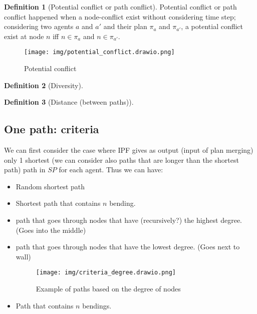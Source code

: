 \documentclass{article}
\theoremstyle{definition}
\newtheorem{definition}{Definition}[section]
\newcommand\widthimg{11cm}
\begin{document}
\begin{definition}[Potential conflict or path conflict]\label{def_potential_conflict}
   Potential conflict or path conflict happened when  a node-conflict exist without considering time step; considering two agents $a$ and $a'$ and their plan $\pi_a$ and $\pi_{a'}$, a potential conflict exist at node $n$ iff $n\in\pi_a$ and $n\in\pi_{a'}$. 
  
\end{definition}

\begin{figure}[H]\label{img:potential_conflict}
  \centering
  \caption{Potential conflict}
  \texttt{[image: img/potential\_conflict.drawio.png]}
\end{figure}

\begin{definition}[Diversity]

\end{definition}

\begin{definition}[Distance (between paths)]
  
\end{definition}

\subsection{One path: criteria}

We can first consider the case where IPF gives as output (input of plan merging) only 1 shortest (we can consider also paths that are longer than the shortest path) path in $SP$ for each agent. Thus we can have:

\begin{itemize}
  \item Random shortest path
  \item Shortest path that contains \(n\) bending. 
  \item path that goes through nodes that have (recursively?) the highest degree. (Goes into the middle)
  \item path that goes through nodes that have the lowest degree. (Goes next to wall)
  \begin{figure}[H]\label{img:criteria_degree}
    \centering
    \caption{Example of paths based on the degree of nodes}
    \texttt{[image: img/criteria\_degree.drawio.png]}
  \end{figure}
  \item Path that contains $n$ bendings.  
  
\end{itemize}
\end{document}
